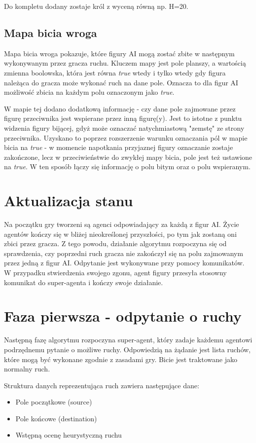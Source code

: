 \documentclass[a4paper,12pt,oneside,notitlepage,onecolumn]{article}
\begin{document}
Do kompletu dodany zostaje król z wyceną równą np. H=20.

\subsection{Mapa bicia wroga}
Mapa bicia wroga pokazuje, które figury AI mogą zostać zbite w następnym wykonywanym przez gracza ruchu.
Kluczem mapy jest pole planszy, a wartością zmienna boolowska, która jest równa \emph{true} wtedy i tylko wtedy gdy figura należąca do gracza może wykonać ruch na dane pole.
Oznacza to dla figur AI możliwość zbicia na każdym polu oznaczonym jako \emph{true}.

W mapie tej dodano dodatkową informację - czy dane pole zajmowane przez figurę przeciwnika jest wspierane przez inną figurę(y).
Jest to istotne z punktu widzenia figury bijącej, gdyż może oznaczać natychmiastową "zemstę" ze strony przeciwnika.
Uzyskano to poprzez rozszerzenie warunku oznaczania pól w mapie bicia na \emph{true} - w momencie napotkania przyjaznej figury oznaczanie zostaje zakończone,
lecz w przeciwieństwie do zwykłej mapy bicia, pole jest też ustawione na \emph{true}.
W ten sposób łączy się informację o polu bitym oraz o polu wspieranym.  

\section{Aktualizacja stanu}
Na początku gry tworzeni są agenci odpowiadający za każdą z figur AI.
Życie agentów kończy się w bliżej nieokreślonej przyszłości, po tym jak zostaną oni zbici przez gracza.
Z tego powodu, działanie algorytmu rozpoczyna się od sprawdzenia, czy poprzedni ruch gracza nie zakończył się na polu zajmowanym przez jedną z figur AI.
Odpytanie jest wykonywane przy pomocy komunikatów.
W przypadku stwierdzenia swojego zgonu, agent figury przesyła stosowny komunikat do super-agenta i kończy swoje działanie.

\section{Faza pierwsza - odpytanie o ruchy}
Następną fazę algorytmu rozpoczyna super-agent, który zadaje każdemu agentowi podrzędnemu pytanie o możliwe ruchy.
Odpowiedzią na żądanie jest lista ruchów, które mogą być wykonane zgodnie z zasadami gry.
Bicie jest traktowane jako normalny ruch.

Struktura danych reprezentująca ruch zawiera następujące dane:
\begin{itemize}
 \item Pole początkowe (source)
 \item Pole końcowe (destination)
 \item Wstępną ocenę heurystyczną ruchu
\end{itemize}
\end{document}
